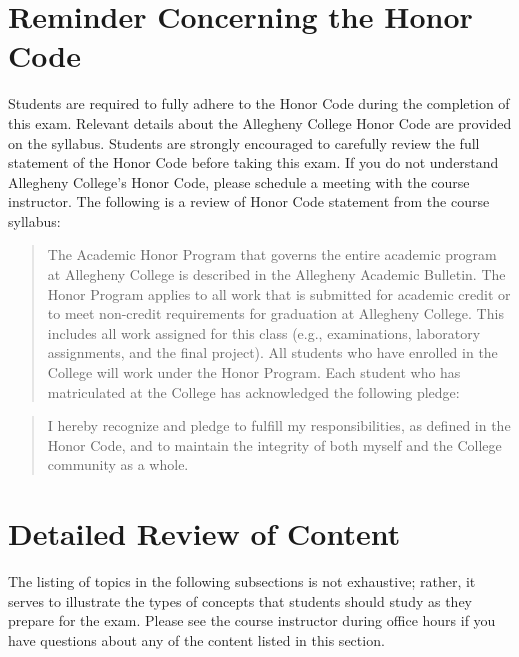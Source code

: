 \documentclass[11pt]{article}
\begin{document}
\section*{Reminder Concerning the Honor Code}

\noindent Students are required to fully adhere to the Honor Code during the
completion of this exam. Relevant details about the Allegheny College Honor Code
are provided on the syllabus. Students are strongly encouraged to carefully
review the full statement of the Honor Code before taking this exam. If you do
not understand Allegheny College's Honor Code, please schedule a meeting with
the course instructor. The following is a review of Honor Code statement from
the course syllabus:

\vspace*{-.05in}

\begin{quote}
The Academic Honor Program that governs the entire academic program at
Allegheny College is described in the Allegheny Academic Bulletin. The Honor
Program applies to all work that is submitted for academic credit or to meet
non-credit requirements for graduation at Allegheny College. This includes all
work assigned for this class (e.g., examinations, laboratory assignments, and
the final project). All students who have enrolled in the College will work
under the Honor Program.  Each student who has matriculated at the College has
acknowledged the following pledge:
\end{quote}

\vspace*{-.2in}

\begin{quote}
%
  I hereby recognize and pledge to fulfill my responsibilities, as defined in
  the Honor Code, and to maintain the integrity of both myself and the College
  community as a whole.
%
\end{quote}

\vspace*{-.1in}

\section*{Detailed Review of Content}

The listing of topics in the following subsections is not exhaustive; rather,
it serves to illustrate the types of concepts that students should study as
they prepare for the exam. Please see the course instructor during office hours
if you have questions about any of the content listed in this section.
\end{document}
